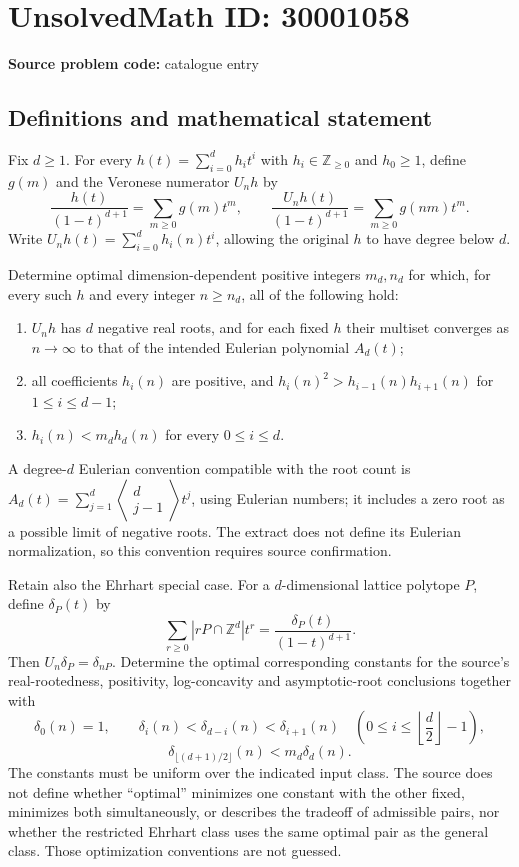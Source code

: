 \documentclass[11pt]{article}
\newcommand{\Z}{\mathbb{Z}}
\begin{document}
\section*{UnsolvedMath ID: 30001058}
\textbf{Source problem code:} catalogue entry
\subsection{Definitions and mathematical statement}
Fix $d\geq1$. For every $h(t)=\sum_{i=0}^{d}h_it^i$ with $h_i\in\Z_{\geq0}$ and $h_0\geq1$, define $g(m)$ and the Veronese numerator $U_nh$ by
\[
\frac{h(t)}{(1-t)^{d+1}}=\sum_{m\geq0}g(m)t^m,
\qquad
\frac{U_nh(t)}{(1-t)^{d+1}}=\sum_{m\geq0}g(nm)t^m.
\]
Write $U_nh(t)=\sum_{i=0}^{d}h_i(n)t^i$, allowing the original $h$ to have degree below $d$.

Determine optimal dimension-dependent positive integers $m_d,n_d$ for which, for every such $h$ and every integer $n\geq n_d$, all of the following hold:
\begin{enumerate}
\item $U_nh$ has $d$ negative real roots, and for each fixed $h$ their multiset converges as $n\to\infty$ to that of the intended Eulerian polynomial $A_d(t)$;
\item all coefficients $h_i(n)$ are positive, and $h_i(n)^2>h_{i-1}(n)h_{i+1}(n)$ for $1\leq i\leq d-1$;
\item $h_i(n)<m_dh_d(n)$ for every $0\leq i\leq d$.
\end{enumerate}
A degree-$d$ Eulerian convention compatible with the root count is $A_d(t)=\sum_{j=1}^{d}\left\langle\begin{smallmatrix}d\\j-1\end{smallmatrix}\right\rangle t^j$, using Eulerian numbers; it includes a zero root as a possible limit of negative roots. The extract does not define its Eulerian normalization, so this convention requires source confirmation.

Retain also the Ehrhart special case. For a $d$-dimensional lattice polytope $P$, define $\delta_P(t)$ by
\[
\sum_{r\geq0}|rP\cap\Z^d|t^r=\frac{\delta_P(t)}{(1-t)^{d+1}}.
\]
Then $U_n\delta_P=\delta_{nP}$. Determine the optimal corresponding constants for the source's real-rootedness, positivity, log-concavity and asymptotic-root conclusions together with
\[
\delta_0(n)=1,\qquad
\delta_i(n)<\delta_{d-i}(n)<\delta_{i+1}(n)
\quad\left(0\leq i\leq\left\lfloor\frac d2\right\rfloor-1\right),
\]
\[
\delta_{\lfloor(d+1)/2\rfloor}(n)<m_d\delta_d(n).
\]
The constants must be uniform over the indicated input class. The source does not define whether ``optimal'' minimizes one constant with the other fixed, minimizes both simultaneously, or describes the tradeoff of admissible pairs, nor whether the restricted Ehrhart class uses the same optimal pair as the general class. Those optimization conventions are not guessed.
\end{document}
